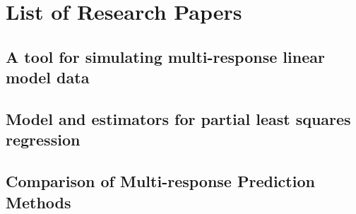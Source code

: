 \documentclass[11pt,twoside,openright,titlepage,
  headinclude,footinclude,BCOR=5mm,
  numbers=noenddot,cleardoublepage=empty,
  tablecaptionabove, dottedtoc,
  bibliography=totoc]{scrreprt}
\begin{document}
  \renewcommand\bibname{References}
  


\nocite{*}

\appendix
\part*{List of Research Papers}
\par\chapter{A tool for simulating multi-response linear model data}
\cleardoublepage

\par\chapter{Model and estimators for partial least squares regression}
\cleardoublepage

\par\chapter{Comparison of Multi-response Prediction Methods}
\cleardoublepage


\end{document}
